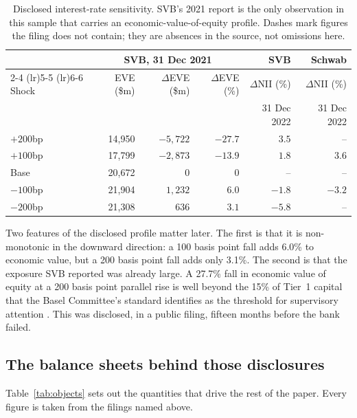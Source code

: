 \begin{table}[htbp]
\centering
\caption{Disclosed interest-rate sensitivity. SVB's 2021 report is the only
observation in this sample that carries an economic-value-of-equity profile.
Dashes mark figures the filing does not contain; they are absences in the source,
not omissions here.}
\label{tab:disclosed}
\small
\begin{tabular}{lrrrrr}
\toprule
 & \multicolumn{3}{c}{SVB, 31 Dec 2021} & SVB & Schwab \\
\cmidrule(lr){2-4} \cmidrule(lr){5-5} \cmidrule(lr){6-6}
Shock & EVE (\$m) & $\Delta$EVE (\$m) & $\Delta$EVE (\%) & $\Delta$NII (\%) & $\Delta$NII (\%) \\
 & & & & 31 Dec 2022 & 31 Dec 2022 \\
\midrule
$+200$bp & 14,950 & $-5{,}722$ & $-27.7$ & $3.5$ & -- \\
$+100$bp & 17,799 & $-2{,}873$ & $-13.9$ & $1.8$ & $3.6$ \\
Base     & 20,672 & 0          & 0       & --    & -- \\
$-100$bp & 21,904 & $1{,}232$  & $6.0$   & $-1.8$ & $-3.2$ \\
$-200$bp & 21,308 & $636$      & $3.1$   & $-5.8$ & -- \\
\bottomrule
\end{tabular}
\end{table}

Two features of the disclosed profile matter later. The first is that it is
non-monotonic in the downward direction: a 100 basis point fall adds 6.0\% to
economic value, but a 200 basis point fall adds only 3.1\%. The second is that
the exposure SVB reported was already large. A 27.7\% fall in economic value of
equity at a 200 basis point parallel rise is well beyond the 15\% of Tier~1
capital that the Basel Committee's standard identifies as the threshold for
supervisory attention \citep{BCBS2016}. This was disclosed, in a public filing,
fifteen months before the bank failed.

\subsection{The balance sheets behind those disclosures}

Table~\ref{tab:objects} sets out the quantities that drive the rest of the paper.
Every figure is taken from the filings named above.

